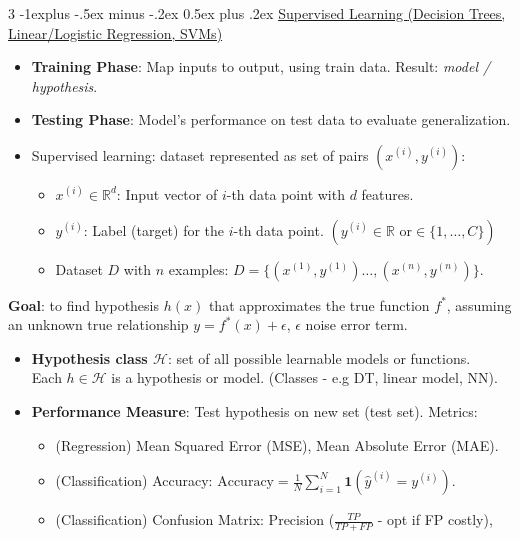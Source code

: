 \documentclass[a4paper, 9pt, landscape]{article}
\makeatletter
\renewcommand{\subsection}{\@startsection{subsection}{2}{0mm}%
                                {-1explus -.5ex minus -.2ex}%
                                {0.5ex plus .2ex}%
                                {\normalfont\normalsize\bfseries}}
\makeatother
\begin{document}
\begin{multicols*}{3}
\subsection{\underline{Supervised Learning {\scriptsize (Decision Trees, Linear/Logistic Regression, SVMs)}}}
\begin{itemize}[itemsep=-2pt]
    \item \textbf{Training Phase}: Map inputs to output, using train data. Result: \textit{model / hypothesis}.
    \item \textbf{Testing Phase}: Model's performance on test data to evaluate generalization.
    \item Supervised learning: dataset represented as set of pairs $(x^{(i)}, y^{(i)})$:
    {
	\setlength{\topsep}{0pt}
	\setlength{\partopsep}{0pt}
    \begin{itemize}[itemsep=-2pt]
	    \item $ x^{(i)} \in \mathbb{R}^d $: Input vector of $ i $-th data point with $ d $ features.
	    \item $ y^{(i)} $: Label (target) for the $ i $-th data point. $( y^{(i)} \in \mathbb{R} \text{ or} \in \{1, \dots, C\}) $
	    \item Dataset $ D $ with $ n $ examples: $ D = \{(x^{(1)}, y^{(1)}) \dots, (x^{(n)}, y^{(n)})\} $.
	\end{itemize}
	}
\end{itemize}
\textbf{Goal}: to find hypothesis $h(x)$ that approximates the true function $f^*$, assuming an unknown true relationship $y = f^*(x) + \epsilon$, $\epsilon$ noise error term.
\begin{itemize}[itemsep=-2pt]
	\item \textbf{Hypothesis class $ \mathcal{H} $}: set of all possible learnable models or functions. \\
	 Each $ h \in \mathcal{H} $ is a hypothesis or model. (Classes - e.g DT, linear model, NN).
	 \item \textbf{Performance Measure}: Test hypothesis on new set (test set). Metrics:
        \begin{itemize}[itemsep=-1.5pt]
            \item (Regression) Mean Squared Error (MSE), Mean Absolute Error (MAE).
            \item (Classification) Accuracy: $ \text{Accuracy} = \frac{1}{N} \sum_{i=1}^N \mathbf{1}(\hat{y}^{(i)} = y^{(i)}) $.
            \item (Classification) Confusion Matrix: Precision ($\frac{TP}{TP + FP}$ - opt if FP costly), \\

\end{itemize}
\end{itemize}
\end{multicols*}
\end{document}
